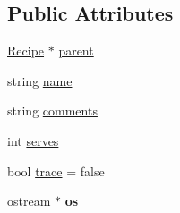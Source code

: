\subsection*{Public Attributes}
\begin{DoxyCompactItemize}
\item 
\hyperlink{classRecipe}{Recipe} $\ast$ \hyperlink{classRecipe_aa0ee8a8dbfef781def252e579bfbc209}{parent}
\item 
string \hyperlink{classRecipe_a721508683a186d64b91c64fa1ea72e06}{name}
\item 
string \hyperlink{classRecipe_a280b7e012414b5e22332b8a7580b371f}{comments}
\item 
int \hyperlink{classRecipe_a265d7fcca7983c4900e76eb10959c9c2}{serves}
\item 
bool \hyperlink{classRecipe_a88d8c79248361e1c53b8ab3a1b91238c}{trace} = false
\item 
\hypertarget{classRecipe_a2a50fe27dd74fa01be53902e7c540dfb}{ostream $\ast$ {\bfseries os}}\label{classRecipe_a2a50fe27dd74fa01be53902e7c540dfb}

\end{DoxyCompactItemize}
